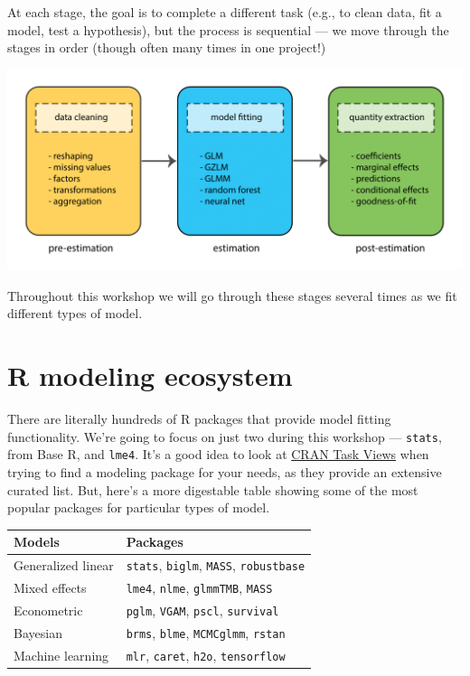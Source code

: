 \documentclass[
]{book}
\begin{document}
At each stage, the goal is to complete a different task (e.g., to clean data, fit a model, test a hypothesis), but the process is sequential --- we move through the stages in order (though often many times in one project!)

\includegraphics{R/Rmodels/images/R_model_pipeline.png}

Throughout this workshop we will go through these stages several times as we fit different types of model.

\hypertarget{r-modeling-ecosystem}{%
\section{R modeling ecosystem}\label{r-modeling-ecosystem}}

There are literally hundreds of R packages that provide model fitting functionality. We're going to focus on just two during this workshop --- \texttt{stats}, from Base R, and \texttt{lme4}. It's a good idea to look at \href{https://cran.r-project.org/web/views/}{CRAN Task Views} when trying to find a modeling package for your needs, as they provide an extensive curated list. But, here's a more digestable table showing some of the most popular packages for particular types of model.

\begin{longtable}[]{@{}ll@{}}
\toprule
Models & Packages\tabularnewline
\midrule
\endhead
Generalized linear & \texttt{stats}, \texttt{biglm}, \texttt{MASS}, \texttt{robustbase}\tabularnewline
Mixed effects & \texttt{lme4}, \texttt{nlme}, \texttt{glmmTMB}, \texttt{MASS}\tabularnewline
Econometric & \texttt{pglm}, \texttt{VGAM}, \texttt{pscl}, \texttt{survival}\tabularnewline
Bayesian & \texttt{brms}, \texttt{blme}, \texttt{MCMCglmm}, \texttt{rstan}\tabularnewline
Machine learning & \texttt{mlr}, \texttt{caret}, \texttt{h2o}, \texttt{tensorflow}\tabularnewline
\bottomrule
\end{longtable}
\end{document}
